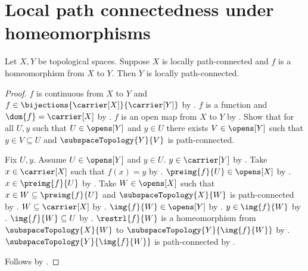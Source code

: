 \section{Local path connectedness under homeomorphisms}




\begin{theorem}\label{homeomorphism_preserves_locally_path_connectedness}
    Let $X,Y$ be topological spaces.
    Suppose $X$ is locally path-connected and $f$ is a homeomorphism from $X$ to $Y$.
    Then $Y$ is locally path-connected.
\end{theorem}
\begin{proof}
    $f$ is continuous from $X$ to $Y$ and $f\in\bijections{\carrier[X]}{\carrier[Y]}$ by
        .
    $f$ is a function and $\dom{f}=\carrier[X]$ by .
    $f$ is an open map from $X$ to $Y$ by .
    Show that for all $U,y$ such that $U\in\opens[Y]$ and $y\in U$ there exists
        $V\in\opens[Y]$ such that $y\in V\subseteq U$ and
        $\subspaceTopology{Y}{V}$ is path-connected.
    \begin{subproof}
        Fix $U,y$.
        Assume $U\in\opens[Y]$ and $y\in U$.
        $y\in\carrier[Y]$ by .
        Take $x\in\carrier[X]$ such that $f(x)=y$ by .
        $\preimg{f}{U}\in\opens[X]$ by .
        $x\in\preimg{f}{U}$ by .
        Take $W\in\opens[X]$ such that $x\in W\subseteq\preimg{f}{U}$ and
            $\subspaceTopology{X}{W}$ is path-connected by .
        $W\subseteq\carrier[X]$ by .
        $\img{f}{W}\in\opens[Y]$ by .
        $y\in\img{f}{W}$ by .
        $\img{f}{W}\subseteq U$ by .
        $\restrl{f}{W}$ is a homeomorphism from $\subspaceTopology{X}{W}$ to
            $\subspaceTopology{Y}{\img{f}{W}}$ by .
        $\subspaceTopology{Y}{\img{f}{W}}$ is path-connected by
            .
    \end{subproof}
    Follows by .
\end{proof}

